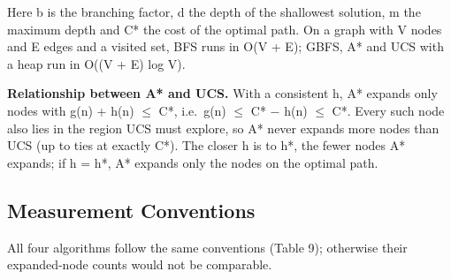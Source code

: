 \documentclass[12pt,a4paper]{article}
\begin{document}
Here b is the branching factor, d the depth of the
shallowest solution, m the maximum depth and C* the cost of
the optimal path. On a graph with V nodes and E edges and a
visited set, BFS runs in O(V + E); GBFS, A* and UCS with a
heap run in O((V + E) log V).

\textbf{Relationship between A* and UCS.} With a consistent
h, A* expands only nodes with g(n) + h(n) \(\le\) C*,
i.e.~g(n) \(\le\) C* \(-\) h(n) \(\le\) C*. Every such node
also lies in the region UCS must explore, so A* never
expands more nodes than UCS (up to ties at exactly C*). The
closer h is to h*, the fewer nodes A* expands; if h = h*, A*
expands only the nodes on the optimal path.

\subsection{Measurement Conventions}

All four algorithms follow the same conventions (Table 9);
otherwise their expanded-node counts would not be
comparable.
\end{document}
